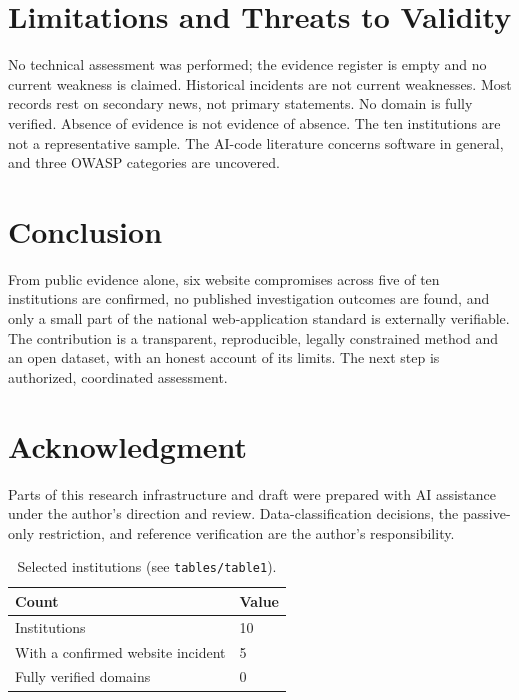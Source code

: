 \documentclass[conference]{IEEEtran}
\begin{document}
\section{Limitations and Threats to Validity}
No technical assessment was performed; the evidence register is empty and no current weakness is
claimed. Historical incidents are not current weaknesses. Most records rest on secondary news,
not primary statements. No domain is fully verified. Absence of evidence is not evidence of
absence. The ten institutions are not a representative sample. The AI-code literature concerns
software in general, and three OWASP categories are uncovered.

\section{Conclusion}
From public evidence alone, six website compromises across five of ten institutions are
confirmed, no published investigation outcomes are found, and only a small part of the national
web-application standard is externally verifiable. The contribution is a transparent,
reproducible, legally constrained method and an open dataset, with an honest account of its
limits. The next step is authorized, coordinated assessment.

\section*{Acknowledgment}
Parts of this research infrastructure and draft were prepared with AI assistance under the
author's direction and review. Data-classification decisions, the passive-only restriction, and
reference verification are the author's responsibility.

\begin{table}[t]\caption{Selected institutions (see \texttt{tables/table1}).}\label{tab:inst}
\centering\footnotesize\begin{tabular}{@{}ll@{}}\toprule Count & Value\\\midrule
Institutions & 10\\ With a confirmed website incident & 5\\ Fully verified domains & 0\\\bottomrule
\end{tabular}\end{table}
\end{document}
